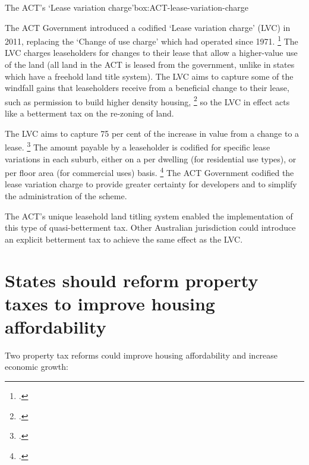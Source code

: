 \begin{smallbox}{The ACT's `Lease variation charge'}{box:ACT-lease-variation-charge}

The ACT Government introduced a codified `Lease variation charge' (LVC) in 2011, replacing the `Change of use charge' which had operated since 1971.%
	\footcite[][4]{Macro_2010_ACT_change_of_use}
The LVC charges leaseholders for changes to their lease that allow a higher-value use of the land (all land in the ACT is leased from the government, unlike in states which have a freehold land title system). The LVC aims to capture some of the windfall gains that leaseholders receive from a beneficial change to their lease, such as permission to build higher density housing,%
	\footcite[][10]{SGS2016__tech_paper_value_capture}
so the LVC in effect acts like a betterment tax on the re-zoning of land.

The LVC aims to capture 75 per cent of the increase in value from a change to a lease.%
  \footcite[][10]{SGS2016__tech_paper_value_capture}
The amount payable by a leaseholder is codified for specific lease variations in each suburb, either on a per dwelling (for residential use types), or per floor area (for commercial uses) basis.
  \footcite{Prosper_murray_2016_ACT_land_value_tax}
The ACT Government codified the lease variation charge to provide greater certainty for developers and to simplify the administration of the scheme.

The ACT's unique leasehold land titling system enabled the implementation of this type of quasi-betterment tax. Other Australian jurisdiction could introduce an explicit betterment tax to achieve the same effect as the LVC.  

\end{smallbox}


\section{States should reform property taxes to improve housing affordability}\label{sec:state-governments-should-reform-property-taxes-to-improve-housing-affordability}

Two property tax reforms could improve housing affordability and increase economic growth:

